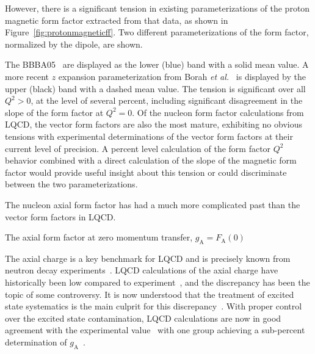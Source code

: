 \documentclass{ar-1col}
\begin{document}
However, there is a significant tension in existing parameterizations of the proton magnetic form factor extracted from that data, as
shown in Figure~\ref{fig:protonmagneticff}.
Two different parameterizations of the form factor, normalized by the dipole, are shown.%
\begin{marginnote}
\end{marginnote}%
The BBBA05~\cite{Bradford:2006yz} are displayed as the lower (blue) band with a solid mean value.
A more recent $z$ expansion parameterization from Borah {\it et al.}~\cite{Borah:2020gte} is displayed by the upper (black) band with a dashed mean value.
The tension is significant over all $Q^2 > 0$, at the level of several percent,
including significant disagreement in the slope of the form factor at $Q^2 = 0$.
Of the nucleon form factor calculations from LQCD,
the vector form factors are also the most mature,
exhibiting no obvious tensions with experimental determinations
of the vector form factors at their current level of precision.
A percent level calculation of the form factor $Q^2$ behavior combined with a direct calculation of the slope of the magnetic form factor would provide useful insight about this tension or could discriminate
between the two parameterizations.

The nucleon axial form factor has had a much more complicated past than the vector form factors in LQCD.%
\begin{marginnote}
  {The axial form factor at zero momentum transfer, $g_{\mathrm{A}} = F_{\mathrm{A}}(0)$}
\end{marginnote}%
The axial charge is a key benchmark for LQCD and is precisely known
from neutron decay experiments~\cite{Dubbers:2021wqv}.
LQCD calculations of the axial charge have historically been low compared to experiment~\cite{Aoki:2021kgd},
 and the discrepancy has been the topic of some controversy.
It is now understood that the treatment of excited state systematics is the main culprit for this discrepancy~\cite{Bar:2017kxh,Ottnad:2020qbw,Aoki:2021kgd}.
With proper control over the excited state contamination, LQCD calculations are now in good agreement with the experimental value~\cite{Jang:2019vkm,Gupta:2018qil,Alexandrou:2020okk,Abramczyk:2019fnf,Park:2021ypf,RQCD:2019jai,Hasan:2019noy,Djukanovic:2021yqg,Harris:2019bih,Liang:2018pis,Shintani:2018ozy,Ishikawa:2018rew}
 with one group achieving a sub-percent determination of $g_{\mathrm{A}}$~\cite{Chang:2018uxx,Berkowitz:2018gqe,Walker-Loud:2019cif}.
\end{document}
